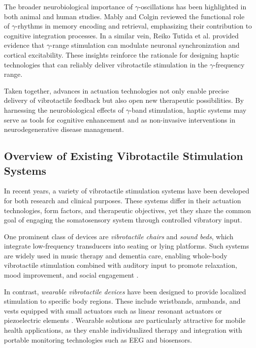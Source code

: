 The broader neurobiological importance of $\gamma$-oscillations has been highlighted in both animal and human studies. Mably and Colgin \cite{Mably.2018} reviewed the functional role of $\gamma$-rhythms in memory encoding and retrieval, emphasizing their contribution to cognitive integration processes. In a similar vein, Reiko Tutida et al. \cite{ReikoTutida.2014} provided evidence that $\gamma$-range stimulation can modulate neuronal synchronization and cortical excitability. These insights reinforce the rationale for designing haptic technologies that can reliably deliver vibrotactile stimulation in the $\gamma$-frequency range.

Taken together, advances in actuation technologies not only enable precise delivery of vibrotactile feedback but also open new therapeutic possibilities. By harnessing the neurobiological effects of $\gamma$-band stimulation, haptic systems may serve as tools for cognitive enhancement and as non-invasive interventions in neurodegenerative disease management.

\subsection{Overview of Existing Vibrotactile Stimulation Systems}
In recent years, a variety of vibrotactile stimulation systems have been developed for both research and clinical purposes. These systems differ in their actuation technologies, form factors, and therapeutic objectives, yet they share the common goal of engaging the somatosensory system through controlled vibratory input.

One prominent class of devices are \textit{vibrotactile chairs} and \textit{sound beds}, which integrate low-frequency transducers into seating or lying platforms. Such systems are widely used in music therapy and dementia care, enabling whole-body vibrotactile stimulation combined with auditory input to promote relaxation, mood improvement, and social engagement \cite{ClementsCortes.2016, ClementsCortes.2017, ClementsCortes.2022}. 

In contrast, \textit{wearable vibrotactile devices} have been designed to provide localized stimulation to specific body regions. These include wristbands, armbands, and vests equipped with small actuators such as linear resonant actuators or piezoelectric elements \cite{Lam.2018, Heesterbeek.2019}. Wearable solutions are particularly attractive for mobile health applications, as they enable individualized therapy and integration with portable monitoring technologies such as EEG and biosensors.


